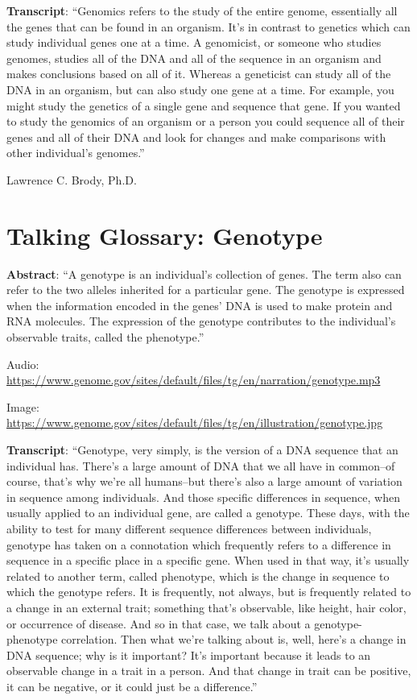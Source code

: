 \documentclass[
]{book}
\begin{document}
\textbf{Transcript}: ``Genomics refers to the study of the entire genome, essentially all the genes that can be found in an organism. It's in contrast to genetics which can study individual genes one at a time. A genomicist, or someone who studies genomes, studies all of the DNA and all of the sequence in an organism and makes conclusions based on all of it. Whereas a geneticist can study all of the DNA in an organism, but can also study one gene at a time. For example, you might study the genetics of a single gene and sequence that gene. If you wanted to study the genomics of an organism or a person you could sequence all of their genes and all of their DNA and look for changes and make comparisons with other individual's genomes.''

Lawrence C. Brody, Ph.D.

\hypertarget{talking-glossary-genotype}{%
\section{Talking Glossary: Genotype}\label{talking-glossary-genotype}}

\textbf{Abstract}: ``A genotype is an individual's collection of genes. The term also can refer to the two alleles inherited for a particular gene. The genotype is expressed when the information encoded in the genes' DNA is used to make protein and RNA molecules. The expression of the genotype contributes to the individual's observable traits, called the phenotype.''

Audio: \url{https://www.genome.gov/sites/default/files/tg/en/narration/genotype.mp3}

Image: \url{https://www.genome.gov/sites/default/files/tg/en/illustration/genotype.jpg}

\textbf{Transcript}: ``Genotype, very simply, is the version of a DNA sequence that an individual has. There's a large amount of DNA that we all have in common--of course, that's why we're all humans--but there's also a large amount of variation in sequence among individuals. And those specific differences in sequence, when usually applied to an individual gene, are called a genotype. These days, with the ability to test for many different sequence differences between individuals, genotype has taken on a connotation which frequently refers to a difference in sequence in a specific place in a specific gene. When used in that way, it's usually related to another term, called phenotype, which is the change in sequence to which the genotype refers. It is frequently, not always, but is frequently related to a change in an external trait; something that's observable, like height, hair color, or occurrence of disease. And so in that case, we talk about a genotype-phenotype correlation. Then what we're talking about is, well, here's a change in DNA sequence; why is it important? It's important because it leads to an observable change in a trait in a person. And that change in trait can be positive, it can be negative, or it could just be a difference.''
\end{document}
